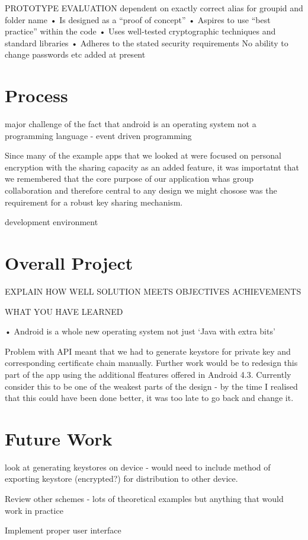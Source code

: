 PROTOTYPE EVALUATION
dependent on exactly correct alias for groupid and folder name
• Is designed as a “proof of concept”
• Aspires to use “best practice” within the code 
• Uses well-tested cryptographic techniques and standard libraries
• Adheres to the stated security requirements 
No ability to change passwords etc added at present
\section{Process}
major challenge of the fact that android is an operating system not a programming language - event driven programming

Since many of the example apps that we looked at were focused on personal encryption with the sharing capacity as an added feature, it was importatnt that we remembered that the core purpose of our application whas group collaboration and therefore central to any design we might chosose was the requirement for a robust key sharing mechanism.

development environment

\section{Overall Project}
EXPLAIN HOW WELL SOLUTION MEETS OBJECTIVES
ACHIEVEMENTS

WHAT YOU HAVE LEARNED

• Android is a whole new operating system not just ‘Java with extra bits’

Problem with API meant that we had to generate keystore for private key and corresponding certificate chain manually.  Further work would be to redesign this part of the app using the additional ffeatures offered in Android 4.3.  Currently consider this to be one of the weakest parts of the design - by the time I realised that this could have been done better, it was too late to go back and change it.

\section{Future Work}

look at generating keystores on device - would need to include method of exporting keystore (encrypted?) for distribution to other device.  

Review other schemes - lots of theoretical examples but anything that would work in practice

Implement proper user interface

